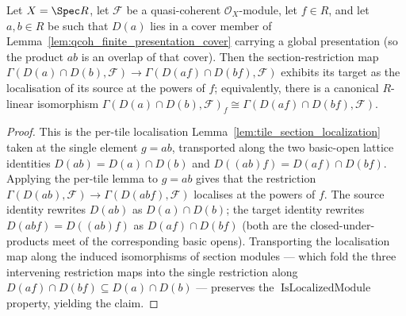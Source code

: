 \begin{lemma}
  \label{lem:overlap_section_localization}
  Let \(X = \Spec R\), let \(\mathcal{F}\) be a quasi-coherent \(\mathcal{O}_X\)-module, let \(f \in R\),
  and let \(a, b \in R\) be such that \(D(a)\) lies in a cover member of
  Lemma~\ref{lem:qcoh_finite_presentation_cover} carrying a global presentation (so the product \(a b\) is
  an overlap of that cover). Then the section-restriction map
  \(\Gamma(D(a) \cap D(b), \mathcal{F}) \to \Gamma(D(af) \cap D(bf), \mathcal{F})\) exhibits its target as
  the localisation of its source at the powers of \(f\); equivalently, there is a canonical \(R\)-linear
  isomorphism \(\Gamma(D(a) \cap D(b), \mathcal{F})_f \cong \Gamma(D(af) \cap D(bf), \mathcal{F})\).
\end{lemma}
\begin{proof}
  This is the per-tile localisation Lemma~\ref{lem:tile_section_localization} taken at the single element
  \(g = a b\), transported along the two basic-open lattice identities \(D(ab) = D(a) \cap D(b)\) and
  \(D((ab)f) = D(af) \cap D(bf)\). Applying the per-tile lemma to \(g = a b\) gives that the restriction
  \(\Gamma(D(ab), \mathcal{F}) \to \Gamma(D(abf), \mathcal{F})\) localises at the powers of \(f\). The
  source identity rewrites \(D(ab)\) as \(D(a) \cap D(b)\); the target identity rewrites \(D(abf) =
  D((ab)f)\) as \(D(af) \cap D(bf)\) (both are the closed-under-products meet of the corresponding basic
  opens). Transporting the localisation map along the induced isomorphisms of section modules — which
  fold the three intervening restriction maps into the single restriction along
  \(D(af) \cap D(bf) \subseteq D(a) \cap D(b)\) — preserves the
  \(\operatorname{IsLocalizedModule}\) property, yielding the claim.
\end{proof}

